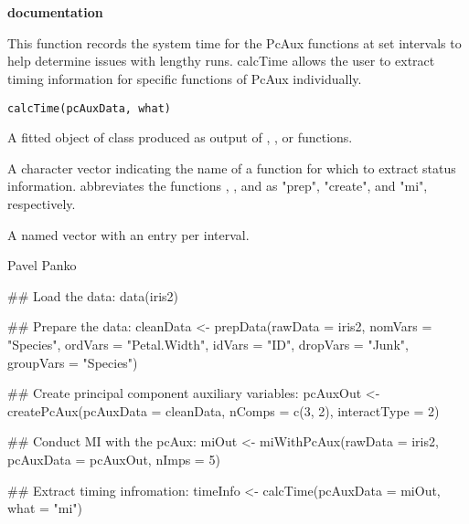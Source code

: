 \documentclass[letterpaper]{book}
\begin{document}
\chapter*{}
\begin{center}
{\textbf{\huge \R{} documentation}} \par{}
\par\bigskip{\large \today}
\end{center}
%
\begin{Description}\relax
This function records the system time for the PcAux functions at set intervals 
to help determine issues with lengthy runs. calcTime allows the user
to extract timing information for specific functions of PcAux
individually. 
\end{Description}
%
\begin{Usage}
\begin{verbatim}
calcTime(pcAuxData, what)
\end{verbatim}
\end{Usage}
%
\begin{Arguments}
\begin{ldescription}
\item[\code{pcAuxData}] 
A fitted object of class  produced as output of
, , or  functions.

\item[\code{what}] 
A character vector indicating the name of a function for which to
extract status information. abbreviates the functions
, , and  as
"prep", "create", and "mi", respectively. 

\end{ldescription}
\end{Arguments}
%
\begin{Value}
A named vector with an entry per interval.
\end{Value}
%
\begin{Author}\relax
Pavel Panko
\end{Author}
%
\begin{Examples}
\begin{ExampleCode}
## Load the data:
data(iris2)

## Prepare the data:
cleanData <- prepData(rawData   = iris2,
                      nomVars   = "Species",
                      ordVars   = "Petal.Width",
                      idVars    = "ID",
                      dropVars  = "Junk",
                      groupVars = "Species")

## Create principal component auxiliary variables:
pcAuxOut <- createPcAux(pcAuxData    = cleanData,
                        nComps       = c(3, 2),
                        interactType = 2)

## Conduct MI with the pcAux:
miOut <- miWithPcAux(rawData   = iris2,
                     pcAuxData = pcAuxOut,
                     nImps     = 5)

## Extract timing infromation:
timeInfo <- calcTime(pcAuxData = miOut, what = "mi")
\end{ExampleCode}
\end{Examples}
\end{document}
